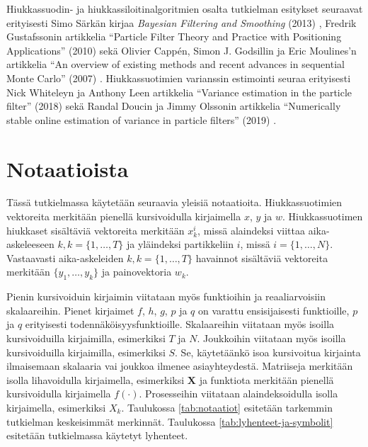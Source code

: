\documentclass[
  12pt,
  a4paper, twoside]{book}
\begin{document}
Hiukkassuodin- ja hiukkassiloitinalgoritmien osalta tutkielman esitykset seuraavat erityisesti Simo Särkän kirjaa \textit{Bayesian Filtering and Smoothing} (2013) \citep{sarkka-2013}, Fredrik Gustafssonin artikkelia ``Particle Filter Theory and Practice with Positioning Applications'' (2010) \citep{gustafsson-2010} sekä Olivier Cappén, Simon J. Godsillin ja Eric Moulines'n artikkelia ``An overview of existing methods and recent advances in sequential Monte Carlo'' (2007) \citep{cappe-2007}. Hiukkassuotimien varianssin estimointi seuraa erityisesti Nick Whiteleyn ja Anthony Leen artikkelia ``Variance estimation in the particle filter'' (2018) \citep{Lee-2018} sekä Randal Doucin ja Jimmy Olssonin artikkelia ``Numerically stable online estimation of variance in particle filters'' (2019) \citep{olsson-2019}.

\section{Notaatioista}

Tässä tutkielmassa käytetään seuraavia yleisiä notaatioita. Hiukkassuotimien vektoreita merkitään pienellä kursivoidulla kirjaimella \(x\), \(y\) ja \(w\). Hiukkassuotimen hiukkaset sisältäviä vektoreita merkitään \(x_k^i\), missä alaindeksi viittaa aika-askeleeseen \(k, k=\{1,\ldots,T\}\) ja yläindeksi partikkeliin \(i\), missä \(i=\{1,\ldots,N\}\). Vastaavasti aika-askeleiden \(k, k=\{1,\ldots,T\}\) havainnot sisältäviä vektoreita merkitään \(\{y_1,\ldots,y_k\}\) ja painovektoria \(w_k\).

Pienin kursivoiduin kirjaimin viitataan myös funktioihin ja reaaliarvoisiin skalaareihin. Pienet kirjaimet \(f\), \(h\), \(g\), \(p\) ja \(q\) on varattu ensisijaisesti funktioille, \(p\) ja \(q\) erityisesti todennäköisyysfunktioille. Skalaareihin viitataan myös isoilla kursivoiduilla kirjaimilla, esimerkiksi \(T\) ja \(N\). Joukkoihin viitataan myös isoilla kursivoiduilla kirjaimilla, esimerkiksi \(S\). Se, käytetäänkö isoa kursivoitua kirjainta ilmaisemaan skalaaria vai joukkoa ilmenee asiayhteydestä. Matriiseja merkitään isolla lihavoidulla kirjaimella, esimerkiksi \(\mathbf{X}\) ja funktiota merkitään pienellä kursivoidulla kirjaimella \(f(\cdot)\). Prosesseihin viitataan alaindeksoidulla isolla kirjaimella, esimerkiksi \(X_k\). Taulukossa \ref{tab:notaatiot} esitetään tarkemmin tutkielman keskeisimmät merkinnät. Taulukossa \ref{tab:lyhenteet-ja-symbolit} esitetään tutkielmassa käytetyt lyhenteet.
\end{document}
